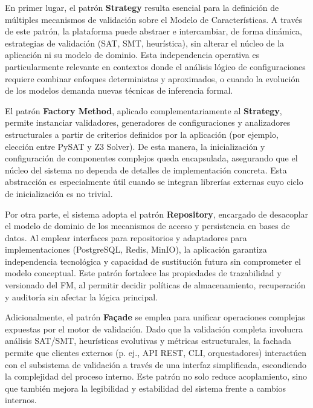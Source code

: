 {{        En primer lugar, el patrón \textbf{Strategy} resulta esencial para la definición de múltiples 
        mecanismos de validación sobre el Modelo de Características. A través de este patrón, 
        la plataforma puede abstraer e intercambiar, de forma dinámica, estrategias de 
        validación (\ac{SAT}, \ac{SMT}, heurística), sin alterar el núcleo de la aplicación ni su modelo 
        de dominio. Esta independencia operativa es particularmente relevante en contextos donde 
        el análisis lógico de configuraciones requiere combinar enfoques deterministas y 
        aproximados, o cuando la evolución de los modelos demanda nuevas técnicas de inferencia 
        formal.

        El patrón \textbf{Factory Method}, aplicado complementariamente al \textbf{Strategy}, permite instanciar 
        validadores, generadores de configuraciones y analizadores estructurales a partir de 
        criterios definidos por la aplicación (por ejemplo, elección entre PySAT y Z3 Solver).
        De esta manera, la inicialización y configuración de componentes complejos queda 
        encapsulada, asegurando que el núcleo del sistema no dependa de detalles de 
        implementación concreta. Esta abstracción es especialmente útil cuando se integran 
        librerías externas cuyo ciclo de inicialización es no trivial.

        Por otra parte, el sistema adopta el patrón \textbf{Repository}, encargado de desacoplar el 
        modelo de dominio de los mecanismos de acceso y persistencia en bases de datos. Al 
        emplear interfaces para repositorios y adaptadores para implementaciones 
        (PostgreSQL, Redis, MinIO), la aplicación garantiza independencia tecnológica y 
        capacidad de sustitución futura sin comprometer el modelo conceptual. Este patrón 
        fortalece las propiedades de trazabilidad y versionado del \ac{FM}, al permitir decidir 
        políticas de almacenamiento, recuperación y auditoría sin afectar la lógica principal.

        Adicionalmente, el patrón \textbf{Façade} se emplea para unificar operaciones complejas 
        expuestas por el motor de validación. Dado que la validación completa involucra 
        análisis \ac{SAT}/\ac{SMT}, heurísticas evolutivas y métricas estructurales, la fachada permite 
        que clientes externos (p. ej., \ac{API} \ac{REST}, \ac{CLI}, orquestadores) interactúen con el 
        subsistema de validación a través de una interfaz simplificada, escondiendo la 
        complejidad del proceso interno. Este patrón no solo reduce acoplamiento, sino que 
        también mejora la legibilidad y estabilidad del sistema frente a cambios internos.

}}

